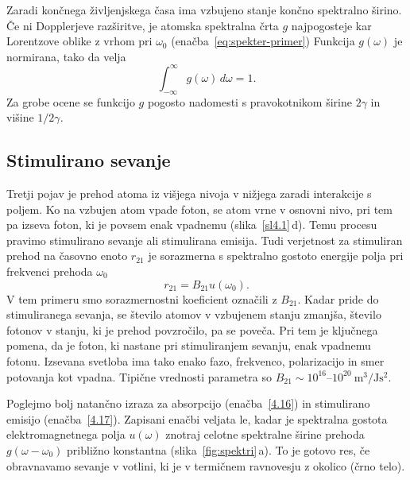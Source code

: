 Zaradi končnega življenjskega časa ima vzbujeno stanje končno spektralno 
širino. Če ni Dop\-pler\-je\-ve razširitve, je atomska spektralna 
črta $g$  najpogosteje kar 
Lorentzove oblike z vrhom pri $\omega_0$
(enačba~\ref{eq:spekter-primer})
Funkcija $g(\omega)$ je normirana, tako da velja
\begin{equation}
\int_{-\infty}^\infty g(\omega)\, d\omega=1.
\label{4.20}
\end{equation}
Za grobe ocene se funkcijo $g$ pogosto nadomesti s pravokotnikom širine
$2\gamma$ in višine $1/2\gamma$.


\subsection*{Stimulirano sevanje}
Tretji pojav je prehod atoma iz višjega nivoja v nižjega zaradi interakcije
s poljem. Ko na vzbujen atom vpade foton, se atom vrne v osnovni nivo, pri 
tem pa izseva foton, ki je povsem enak vpadnemu (slika~\ref{sl4.1}\,d). 
Temu procesu pravimo stimulirano sevanje ali 
stimulirana emisija. Tudi verjetnost za stimuliran prehod na časovno enoto $r_{21}$ 
je sorazmerna s spektralno gostoto energije polja pri frekvenci prehoda $\omega_{0}$
\begin{equation}
r_{21}=B_{21}u(\omega_{0}).
\label{4.17}
\end{equation}
V tem primeru smo sorazmernostni koeficient označili z $B_{21}$. Kadar pride do
stimuliranega sevanja, se število atomov v vzbujenem stanju zmanjša, 
število fotonov v stanju, ki je prehod povzročilo, pa se poveča. Pri tem je 
ključnega pomena, da je foton, ki nastane pri stimuliranjem sevanju, enak vpadnemu fotonu.
Izsevana svetloba ima tako enako fazo, frekvenco, polarizacijo in smer potovanja kot 
vpadna. Tipične vrednosti parametra so $B_{21} \sim 10^{16}$--$10^{20}~\si{\metre^3/\joule\second^2}$.

Poglejmo bolj natančno izraza za absorpcijo
(enačba~\ref{4.16}) in stimulirano emisijo (enačba~\ref{4.17}).
Zapisani enačbi veljata le, kadar je spektralna gostota 
elektromagnetnega polja $u(\omega)$
znotraj celotne spektralne širine prehoda $g(\omega - \omega_0)$ približno konstantna 
(slika~\ref{fig:spektri}\,a). To je gotovo res, če
obravnavamo sevanje v votlini, ki je v termičnem ravnovesju z okolico (črno telo).

